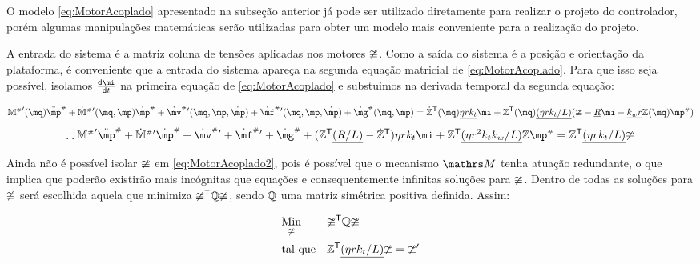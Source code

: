 \documentclass[a4paper,11pt,brazil,fleqn]{article}
\begin{document}
O modelo \eqref{eq:MotorAcoplado} apresentado na subse\c{c}\~ao anterior j\'a pode ser utilizado diretamente para realizar o projeto do controlador, por\'em algumas manipula\c{c}\~oes matem\'aticas ser\~ao utilizadas para obter um modelo mais conveniente para a realiza\c{c}\~ao do projeto.

A entrada do sistema \'e a matriz coluna de tens\~oes aplicadas nos motores  $\mathbb{\upsilon}$. Como a sa\'ida do sistema \'e a posi\c{c}\~ao e orienta\c{c}\~ao da plataforma, \'e conveniente que a entrada do sistema apare\c{c}a na segunda equa\c{c}\~ao matricial de \eqref{eq:MotorAcoplado}. Para que isso seja poss\'ivel, isolamos $\frac{\dd \mi}{\dd t}$ na primeira equa\c{c}\~ao de \eqref{eq:MotorAcoplado} e substuimos na derivada temporal da segunda equa\c{c}\~ao:

\begin{equation}
{\mM\ssh}'(\mq) \ddot{\mp}\ssh + {{\dot{\mM}}\ssh}{'} (\mq,\mp) \dot{\mp}\ssh + {\dot{\mv}\ssh}{'}(\mq,\mp,\dot{\mp}) + {\dot{\mf}\ssh}{'}(\mq,\mp,\dot{\mp}) + {\dot{\mg}\ssh}(\mq,\mp) = \dot{\mZ}^\msT (\mq) \underline{\eta r k_t} \mi + \mZ^\msT (\mq) \underline{(\eta r k_t / L)} ( \mup -  \underline{R} \mi - \underline{k_w r} \mZ (\mq) \mp\ssh )
\end{equation}
\begin{equation} \label{eq:MotorAcoplado2}
\therefore {\mM\ssh}' \ddot{\mp}\ssh + {{\dot{\mM}}\ssh}{'} \dot{\mp}\ssh + {\dot{\mv}\ssh}{'} + {\dot{\mf}\ssh}{'} + {\dot{\mg}\ssh} + ( \mZ^\msT  \underline{(R/L)} - \dot{\mZ}^\msT ) \underline{\eta r k_t} \mi + \mZ^\msT  \underline{(\eta r^2 k_t k_w / L)}  \mZ \mp\ssh =  \mZ^\msT  \underline{(\eta r k_t / L)} \mup
\end{equation}

Ainda n\~ao \'e poss\'ivel isolar $\mathbb{\upsilon}$ em \eqref{eq:MotorAcoplado2}, pois \'e poss\'ivel que o mecanismo $\ssM$ tenha atua\c{c}\~ao redundante, o que implica que poder\~ao existir\~ao mais inc\'ognitas que equa\c{c}\~oes e consequentemente infinitas solu\c{c}\~oes para $\mathbb{\upsilon}$. Dentro de todas as solu\c{c}\~oes para $\mathbb{\upsilon}$ ser\'a escolhida aquela que minimiza $\mathbb{\upsilon}^{\mathsf{T}} \mathbb{Q} \mathbb{\upsilon}$, sendo $\mathbb{Q}$ uma matriz sim\'etrica positiva definida. Assim:

\begin{equation} \label{eq:Optimization_}
\begin{aligned}
& \underset{\mathbb{\upsilon}}{\text{Min}}
& & \mathbb{\upsilon}^{\mathsf{T}} \mathbb{Q} \mathbb{\upsilon} \\
& \text{tal que}
& & \mathbb{Z}^{\mathsf{T}}  \underline{(\eta r k_t / L)} \mathbb{\upsilon} = \mathbb{\upsilon}'
\end{aligned}
\end{equation}
\end{document}

